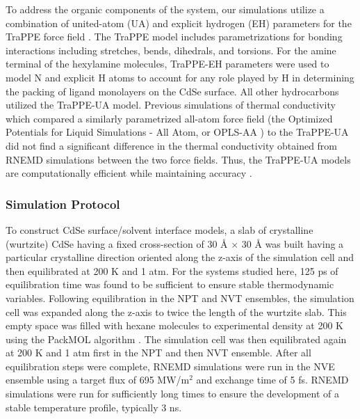 To address the organic components of the system, our simulations utilize a combination of united-atom (UA) and explicit hydrogen (EH) parameters for the TraPPE force field \cite{doi:10.1021/jp0504827}.  The TraPPE model includes parametrizations for bonding interactions including stretches, bends, dihedrals, and torsions. For the amine terminal of the hexylamine molecules, TraPPE-EH parameters were used to model N and explicit H atoms to account for any role played by H in determining the packing of ligand monolayers on the CdSe surface. All other hydrocarbons utilized the TraPPE-UA model. Previous simulations of thermal conductivity which compared a similarly parametrized all-atom force field (the Optimized Potentials for Liquid Simulations - All Atom, or OPLS-AA \cite{jorgensen1988opls}) to the TraPPE-UA did not find a significant difference in the thermal conductivity obtained from RNEMD simulations between the two force fields. Thus, the TraPPE-UA models are computationally efficient while maintaining accuracy \cite{doi:10.1021/jp2073478}.  \par

\subsubsection{Simulation Protocol}

To construct CdSe surface/solvent interface models, a slab of crystalline (wurtzite) CdSe having a fixed cross-section of 30 \r{A}  $\times$ 30 \r{A} was built having a particular crystalline direction oriented along the z-axis of the simulation cell and then equilibrated at 200 K and 1 atm. For the systems studied here, 125 ps of equilibration time was found to be sufficient to ensure stable thermodynamic variables. Following equilibration in the NPT and NVT ensembles, the simulation cell was expanded along the z-axis to twice the length of the wurtzite slab. This empty space was filled with hexane molecules to experimental density at 200 K using the PackMOL algorithm \cite{JCC:JCC21224}.  The simulation cell was then equilibrated again at 200 K and 1 atm first in the NPT and then NVT ensemble. After all equilibration steps were complete, RNEMD simulations were run in the NVE ensemble using a target flux of 695 MW/m$^2$ and exchange time of 5 fs. RNEMD simulations were run for sufficiently long times to ensure the development of a stable temperature profile, typically 3 ns. \par

